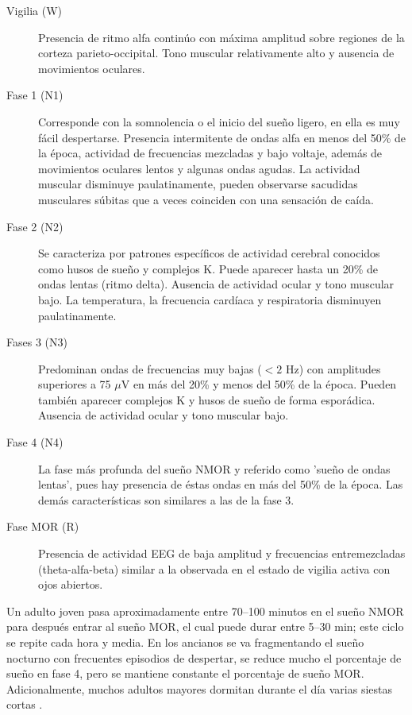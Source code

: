 \documentclass[12pt,a4paper]{mitthesis}
\begin{document}
\begin{description}
\item[Vigilia (W)] Presencia de ritmo alfa contin\'uo con m\'axima amplitud sobre regiones de la 
corteza parieto-occipital. Tono muscular relativamente alto y ausencia de movimientos oculares.

\item[Fase 1 (N1)] Corresponde con la somnolencia o el inicio del sue\~no ligero, en ella es muy 
f\'acil despertarse. 
Presencia intermitente de ondas alfa en menos del 50\% de la \'epoca, actividad de frecuencias 
mezcladas y bajo voltaje, adem\'as de movimientos oculares lentos y algunas ondas agudas. 
La actividad muscular disminuye paulatinamente, pueden observarse sacudidas musculares s\'ubitas 
que a veces coinciden con una sensaci\'on de ca\'ida. 

\item[Fase 2 (N2)] Se caracteriza por patrones espec\'ificos de actividad cerebral conocidos como 
husos de sue\~no y complejos K. 
Puede aparecer hasta un 20\% de ondas lentas (ritmo delta). Ausencia de actividad ocular y tono 
muscular bajo.
La temperatura, la frecuencia card\'iaca y respiratoria disminuyen paulatinamente. 

\item[Fases 3 (N3)] Predominan ondas de frecuencias muy bajas ($<2$ Hz) con amplitudes superiores a 
75 $\mu$V en m\'as del 20\% y menos del 50\% de la \'epoca. Pueden tambi\'en aparecer complejos K y 
husos de sue\~no de forma espor\'adica. Ausencia de actividad ocular y tono muscular bajo.

\item[Fase 4 (N4)] La fase m\'as profunda del sue\~no NMOR y referido como 'sue\~no de ondas 
lentas', pues hay presencia de \'estas ondas en m\'as del 50\% de la \'epoca. Las dem\'as 
caracter\'isticas son similares a las de la fase 3.

\item[Fase MOR (R)] Presencia de actividad EEG de baja amplitud y frecuencias entremezcladas 
(theta-alfa-beta) similar a la observada en el estado de vigilia activa con ojos abiertos.
\end{description}

Un adulto joven pasa aproximadamente entre 70--100 minutos en el sue\~no NMOR para despu\'es entrar 
al sue\~no MOR, el cual puede durar entre 5--30 min; este ciclo se repite cada hora y media.
En los ancianos se va fragmentando el sue\~no nocturno con frecuentes episodios de despertar, se 
reduce mucho el porcentaje de sue\~no en fase 4, pero se mantiene constante el porcentaje de 
sue\~no MOR. Adicionalmente, muchos adultos mayores dormitan durante el d\'ia varias siestas cortas 
\cite{CarrilloMora}.
\end{document}
